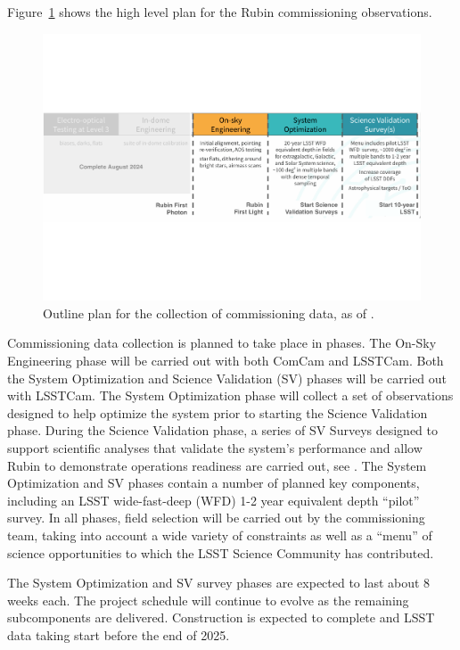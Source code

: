 Figure~\ref{fig:commissioning} shows the high level plan for the Rubin commissioning observations. 
\begin{figure}[htb]
\centering
\includegraphics[width=0.95\linewidth]{figures/commissioning-plan}
\caption{Outline plan for the collection of commissioning data, as of \currentdate.}
\label{fig:commissioning}
\end{figure}
Commissioning data collection is planned to take place in phases.
The On-Sky Engineering phase will be carried out with both ComCam and LSSTCam.
Both the System Optimization and Science Validation (SV) phases will be carried out with LSSTCam. 
The System Optimization phase will collect a set of observations designed to help optimize the system prior to starting the Science Validation phase.
During the Science Validation phase, a series of SV Surveys designed to support scientific analyses that validate the system's performance and allow Rubin to demonstrate operations readiness are carried out, see .
The System Optimization and SV phases contain a number of planned key components, including an LSST wide-fast-deep (WFD) 1-2 year equivalent depth ``pilot'' survey.
In all phases, field selection will be carried out by the commissioning team, taking into account a wide variety of constraints as well as a ``menu'' of science opportunities to which the LSST Science Community has contributed.

The System Optimization and SV survey phases are expected to last about 8 weeks each.
The project schedule will continue to evolve as the remaining subcomponents are delivered. 
Construction is expected to complete and LSST data taking start before the end of 2025.

